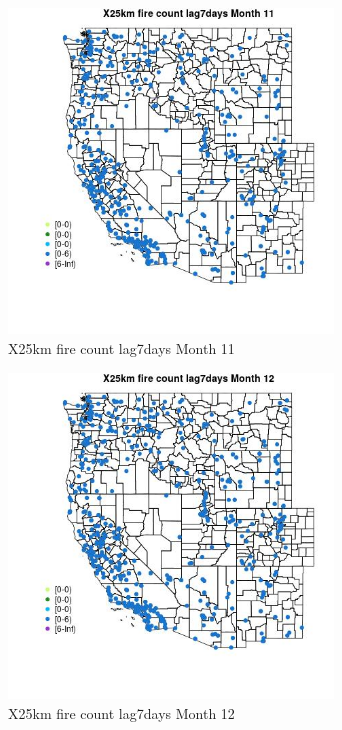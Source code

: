 \begin{figure} 
\centering  
\includegraphics[width=0.77\textwidth]{Code_Outputs/Report_ML_input_PM25_Step4_part_e_de_duplicated_aves_compiled_2019-05-14wNAs_MapObsMo11X25km_fire_count_lag7days.jpg} 
\caption{\label{fig:Report_ML_input_PM25_Step4_part_e_de_duplicated_aves_compiled_2019-05-14wNAsMapObsMo11X25km_fire_count_lag7days}X25km fire count lag7days Month 11} 
\end{figure} 
 

\begin{figure} 
\centering  
\includegraphics[width=0.77\textwidth]{Code_Outputs/Report_ML_input_PM25_Step4_part_e_de_duplicated_aves_compiled_2019-05-14wNAs_MapObsMo12X25km_fire_count_lag7days.jpg} 
\caption{\label{fig:Report_ML_input_PM25_Step4_part_e_de_duplicated_aves_compiled_2019-05-14wNAsMapObsMo12X25km_fire_count_lag7days}X25km fire count lag7days Month 12} 
\end{figure} 
 

